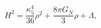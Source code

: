 \begin{equation}
H^2=\frac{\kappa_5^4}{36}\rho^2 + \frac{8\pi G_N}{3}\rho + \Lambda,
\end{equation}

